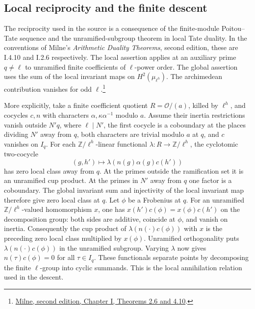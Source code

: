 \subsection{Local reciprocity and the finite descent}

The reciprocity used in the source is a consequence of the
finite-module Poitou--Tate sequence and the unramified-subgroup
theorem in local Tate duality. In the conventions of Milne's
\emph{Arithmetic Duality Theorems}, second edition, these are
I.4.10 and I.2.6 respectively. The local assertion applies at an
auxiliary prime \(q\ne\ell\) to unramified finite coefficients of
\(\ell\)-power order. The global assertion uses the sum of the
local invariant maps on \(H^2(\mu_{\ell^h})\). The archimedean
contribution vanishes for odd \(\ell\).\footnote{\href{https://www.jmilne.org/math/Books/ADTnot.pdf}{Milne, second edition, Chapter I, Theorems 2.6 and 4.10}.}

More explicitly, take a finite coefficient quotient \(R=\mathcal
O/(a)\), killed by \(\ell^h\), and cocycles \(c,n\) with characters
\(\alpha,\kappa\alpha^{-1}\) modulo \(a\). Assume their inertia
restrictions vanish outside \(N'q\), where \(\ell\mid N'\), the
first cocycle is a coboundary at the places dividing \(N'\) away
from \(q\), both characters are trivial modulo \(a\) at \(q\), and
\(c\) vanishes on \(I_q\). For each \(\mathbb Z/\ell^h\)-linear
functional \(\lambda:R\to\mathbb Z/\ell^h\), the cyclotomic
two-cocycle
\[
        (g,h')\longmapsto\lambda(n(g)\alpha(g)c(h'))
\]
has zero local class away from \(q\). At the primes outside the
ramification set it is an unramified cup product. At the primes
in \(N'\) away from \(q\) one factor is a coboundary. The global
invariant sum and injectivity of the local invariant map therefore
give zero local class at \(q\). Let \(\phi\) be a Frobenius at \(q\).
For an unramified \(\mathbb Z/\ell^h\)-valued homomorphism \(x\),
one has \(x(h')c(\phi)=x(\phi)c(h')\) on the decomposition group:
both sides are additive, coincide at \(\phi\), and vanish on
inertia. Consequently the cup product of
\(\lambda(n(\cdot)c(\phi))\) with \(x\) is the preceding zero local
class multiplied by \(x(\phi)\). Unramified orthogonality puts
\(\lambda(n(\cdot)c(\phi))\) in the unramified subgroup. Varying
\(\lambda\) now gives \(n(\tau)c(\phi)=0\) for all \(\tau\in I_q\).
These functionals separate points by decomposing the finite
\(\ell\)-group into cyclic summands. This is the local
annihilation relation used in the descent.

